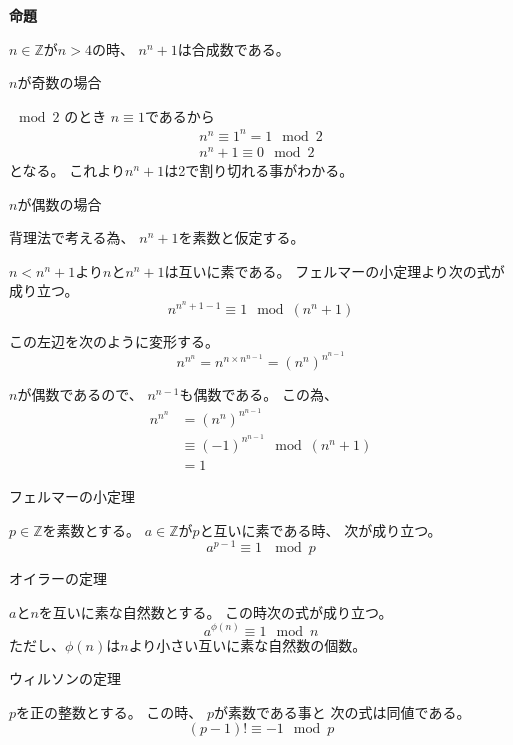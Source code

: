 \documentclass[12pt,b5paper]{ltjsarticle}
\begin{document}
\hrulefill

\textbf{命題}

$n\in\mathbb{Z}$が$n>4$の時、
$n^n+1$は合成数である。

\hrulefill


$n$が奇数の場合

$\mod 2$ のとき
$n \equiv 1$であるから
\begin{gather}
 n^n \equiv 1^n = 1 \mod 2\\
 n^n +1 \equiv 0 \mod 2
\end{gather}
となる。
これより$n^n+1$は2で割り切れる事がわかる。


$n$が偶数の場合

背理法で考える為、
$n^n +1$を素数と仮定する。

$n< n^n+1$より$n$と$n^n+1$は互いに素である。
フェルマーの小定理より次の式が成り立つ。
\begin{equation}
 n^{n^n+1-1} \equiv 1 \mod (n^n+1)
\end{equation}

この左辺を次のように変形する。
\begin{equation}
 n^{n^n} = n^{n\times n^{n-1}} = (n^n)^{n^{n-1}}
\end{equation}

$n$が偶数であるので、
$n^{n-1}$も偶数である。
この為、
\begin{align}
 n^{n^n} &= (n^n)^{n^{n-1}}\\
 &\equiv (-1)^{n^{n-1}} \mod (n^n+1)\\
 &= 1
\end{align}


\hrulefill


\hrulefill
フェルマーの小定理
\hrulefill

$p\in\mathbb{Z}$を素数とする。
$a\in\mathbb{Z}$が$p$と互いに素である時、
次が成り立つ。
\begin{equation}
 a^{p-1} \equiv 1 \ \mod p
\end{equation}

\hrulefill

\hrulefill
オイラーの定理
\hrulefill

$a$と$n$を互いに素な自然数とする。
この時次の式が成り立つ。
\begin{equation}
 a^{\phi(n)} \equiv 1 \mod n
\end{equation}
ただし、$\phi(n)$は$n$より小さい互いに素な自然数の個数。

\hrulefill

\hrulefill
ウィルソンの定理
\hrulefill

$p$を正の整数とする。
この時、
$p$が素数である事と
次の式は同値である。
\begin{equation}
(p-1)! \equiv -1 \mod p
\end{equation}


\hrulefill
\end{document}
